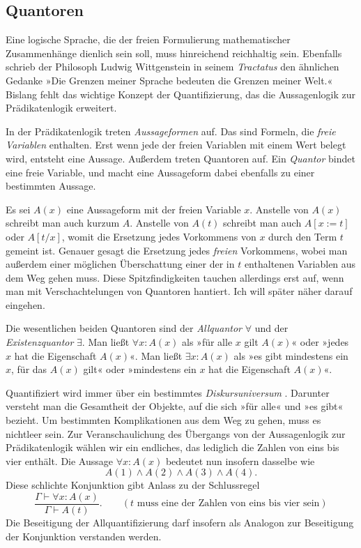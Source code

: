 \subsection{Quantoren}

Eine logische Sprache, die der freien Formulierung mathematischer
Zusammenhänge dienlich sein soll, muss hinreichend reichhaltig sein.
Ebenfalls schrieb der Philosoph Ludwig Wittgenstein in seinem
\emph{Tractatus} den ähnlichen Gedanke »Die Grenzen meiner Sprache
bedeuten die Grenzen meiner Welt.« Bislang fehlt das wichtige Konzept
der Quantifizierung, das die Aussagenlogik zur Prädikatenlogik
erweitert.

In der Prädikatenlogik treten \emph{Aussageformen}
auf. Das sind Formeln, die \emph{freie Variablen}
enthalten. Erst wenn jede der freien Variablen mit einem Wert belegt
wird, entsteht eine Aussage. Außerdem treten Quantoren auf. Ein
\emph{Quantor} bindet eine freie Variable, und macht
eine Aussageform dabei ebenfalls zu einer bestimmten Aussage.


Es sei $A(x)$ eine Aussageform mit der freien Variable $x$. Anstelle
von $A(x)$ schreibt man auch kurzum $A$. Anstelle von $A(t)$ schreibt
man auch $A[x:=t]$ oder $A[t/x]$, womit die Ersetzung jedes Vorkommens
von $x$ durch den Term $t$ gemeint ist. Genauer gesagt die Ersetzung
jedes \emph{freien} Vorkommens, wobei man außerdem einer möglichen
Überschattung einer der in $t$ enthaltenen Variablen aus dem Weg gehen
muss. Diese Spitzfindigkeiten tauchen allerdings erst auf, wenn man mit
Verschachtelungen von Quantoren hantiert. Ich will später
näher darauf eingehen.

Die wesentlichen beiden Quantoren sind der \emph{Allquantor}%
 $\forall$ und der
\emph{Existenzquantor} $\exists$. Man ließt
$\forall x\colon A(x)$ als »für alle $x$ gilt $A(x)$« oder »jedes $x$
hat die Eigenschaft $A(x)$«. Man ließt $\exists x\colon A(x)$ als »es
gibt mindestens ein $x$, für das $A(x)$ gilt« oder »mindestens ein $x$
hat die Eigenschaft $A(x)$«.

Quantifiziert wird immer über ein bestimmtes \emph{Diskursuniversum}%
. Darunter versteht man die Gesamtheit der
Objekte, auf die sich »für alle« und »es gibt« bezieht. Um bestimmten
Komplikationen aus dem Weg zu gehen, muss es nichtleer sein. Zur
Veranschaulichung des Übergangs von der Aussagenlogik zur Prädikatenlogik
wählen wir ein endliches, das lediglich die Zahlen von eins bis vier
enthält. Die Aussage $\forall x\colon A(x)$ bedeutet nun insofern
dasselbe wie
\[A(1)\land A(2)\land A(3)\land A(4).\]
Diese schlichte Konjunktion gibt Anlass zu der Schlussregel
\[\dfrac{\Gamma\vdash\forall x\colon A(x)}{\Gamma\vdash A(t)}.
\qquad(\text{$t$ muss eine der Zahlen von eins bis vier sein})\]
Die Beseitigung der Allquantifizierung darf insofern als Analogon zur
Beseitigung der Konjunktion verstanden werden.

